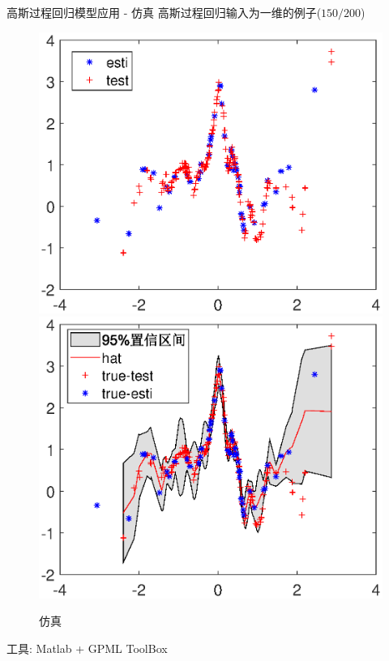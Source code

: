 \documentclass[10pt,mathserif]{beamer}
\theoremstyle{definition}
\numberwithin{equation}{section} %
\begin{document}
    \begin{frame}{高斯过程回归模型应用 - 仿真}
        高斯过程回归输入为一维的例子($150/200$)
        \vspace{-1ex}
        \begin{figure}[H]
            \centering
            \includegraphics[scale=0.35]{fig/例子1.eps}
            \includegraphics[scale=0.35]{fig/例子2.eps}
            \caption{仿真}
        \end{figure}

        工具: Matlab + GPML ToolBox



    \end{frame}
\end{document}

